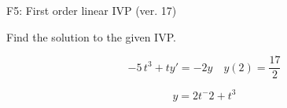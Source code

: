 \begin{exercise}
  \begin{exerciseTitle}F5: First order linear IVP (ver. 17)\end{exerciseTitle}
  \begin{exerciseStatement}
    
Find the solution to the given IVP.

    
\[-5 \, t^{3} +ty'= -2 y \hspace{1em} y( 2 ) = \frac{17}{2}\]

  \end{exerciseStatement}
  \begin{exerciseAnswer}
    
\[y= 2 t^ -2 + t^{3}\]

  \end{exerciseAnswer}
\end{exercise}